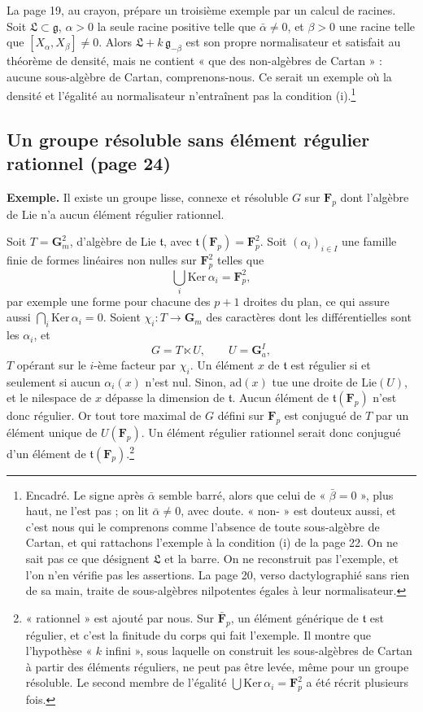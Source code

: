 \documentclass[11pt,a4paper]{article}
\begin{document}
La page 19, au crayon, prépare un troisième exemple par un calcul de
racines. Soit $\mathfrak{L} \subset \mathfrak{g}$, $\alpha > 0$ la seule racine
positive telle que $\bar\alpha \neq 0$, et $\beta > 0$ une racine telle que
$[X_{\alpha}, X_{\beta}] \neq 0$. Alors $\mathfrak{L} + k\,\mathfrak{g}_{-\beta}$
est son propre normalisateur et satisfait au théorème de densité, mais ne
contient « que des non-algèbres de Cartan » : aucune sous-algèbre de Cartan,
comprenons-nous. Ce serait un exemple où la densité et l'égalité au
normalisateur n'entraînent pas la condition (i).\footnote{Encadré. Le signe
après $\bar\alpha$ semble barré, alors que celui de « $\bar\beta = 0$ », plus
haut, ne l'est pas ; on lit $\bar\alpha \neq 0$, avec doute. « non- » est
douteux aussi, et c'est nous qui le comprenons comme l'absence de toute
sous-algèbre de Cartan, et qui rattachons l'exemple à la condition (i) de la
page 22. On ne sait pas ce que désignent $\mathfrak{L}$ et la barre. On ne
reconstruit pas l'exemple, et l'on n'en vérifie pas les assertions. La page
20, verso dactylographié sans rien de sa main, traite de sous-algèbres
nilpotentes égales à leur normalisateur.}

\subsection*{Un groupe résoluble sans élément régulier rationnel (page 24)}

\textbf{Exemple.} Il existe un groupe lisse, connexe et résoluble $G$ sur
$\mathbf{F}_{p}$ dont l'algèbre de Lie n'a aucun élément régulier rationnel.

Soit $T = \mathbf{G}_{m}^{2}$, d'algèbre de Lie $\mathfrak{t}$, avec
$\mathfrak{t}(\mathbf{F}_{p}) = \mathbf{F}_{p}^{2}$. Soit $(\alpha_{i})_{i \in
I}$ une famille finie de formes linéaires non nulles sur $\mathbf{F}_{p}^{2}$
telles que
\[
  \bigcup_{i} \mathrm{Ker}\, \alpha_{i} = \mathbf{F}_{p}^{2} ,
\]
par exemple une forme pour chacune des $p + 1$ droites du plan, ce qui assure
aussi $\bigcap_{i} \mathrm{Ker}\, \alpha_{i} = 0$. Soient
$\chi_{i} : T \to \mathbf{G}_{m}$ des caractères dont les différentielles sont
les $\alpha_{i}$, et
\[
  G = T \ltimes U, \qquad U = \mathbf{G}_{a}^{I},
\]
$T$ opérant sur le $i$-ème facteur par $\chi_{i}$. Un élément $x$ de
$\mathfrak{t}$ est régulier si et seulement si aucun $\alpha_{i}(x)$ n'est
nul. Sinon, $\mathrm{ad}(x)$ tue une droite de $\mathrm{Lie}(U)$, et le nilespace
de $x$ dépasse la dimension de $\mathfrak{t}$. Aucun élément de
$\mathfrak{t}(\mathbf{F}_{p})$ n'est donc régulier. Or tout tore maximal de $G$
défini sur $\mathbf{F}_{p}$ est conjugué de $T$ par un élément unique de
$U(\mathbf{F}_{p})$. Un élément régulier rationnel serait donc conjugué d'un
élément de $\mathfrak{t}(\mathbf{F}_{p})$.\footnote{« rationnel » est ajouté par
nous. Sur $\bar{\mathbf{F}}_{p}$, un élément générique de $\mathfrak{t}$ est
régulier, et c'est la finitude du corps qui fait l'exemple. Il montre que
l'hypothèse « $k$ infini », sous laquelle on construit les sous-algèbres de
Cartan à partir des éléments réguliers, ne peut pas être levée, même pour un
groupe résoluble. Le second membre de l'égalité $\bigcup \mathrm{Ker}\,\alpha_{i} =
\mathbf{F}_{p}^{2}$ a été récrit plusieurs fois.}
\end{document}
